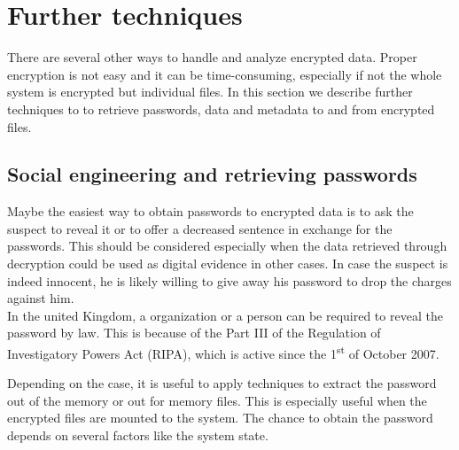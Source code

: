 \section{Further techniques}
There are several other ways to handle and analyze encrypted data. Proper encryption is not easy and it can be time-consuming, especially if not the whole system is encrypted but individual files. In this section we describe further techniques to to retrieve passwords, data and metadata to and from encrypted files.
\subsection{Social engineering and retrieving passwords}
Maybe the easiest way to obtain passwords to encrypted data is to ask the suspect to reveal it or to offer a decreased sentence in exchange for the passwords.
This should be considered especially when the data retrieved through decryption could be used as digital evidence in other cases.
In case the suspect is indeed innocent, he is likely willing to give away his password to drop the charges against him.\\
In the united Kingdom, a organization or a person can be required to reveal the password by law. This is because of the Part III of the Regulation of Investigatory Powers Act (RIPA), which is active since  the 1\textsuperscript{st} of October 2007.\cite{TheEffectOfFileAndDiskEncryption}

Depending on the case, it is useful to apply techniques to extract the password out of the memory or out for memory files. This is especially useful when the encrypted files are mounted to the system. The chance to obtain the password depends on several factors like the system state.\cite{PersistenceOfMomory}

